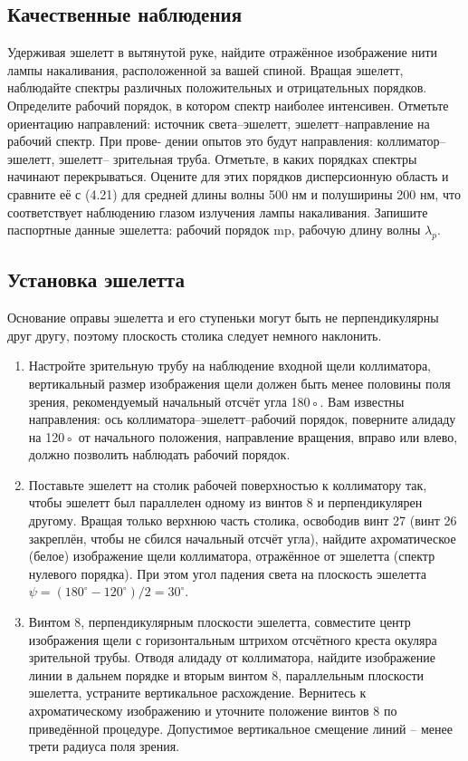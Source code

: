 \documentclass[a4paper]{article}
\begin{document}
\subsection{Качественные наблюдения}
Удерживая эшелетт в вытянутой руке, найдите отражённое изображение
нити лампы накаливания, расположенной за вашей спиной.
Вращая эшелетт, наблюдайте спектры различных положительных и отрицательных
порядков. Определите рабочий порядок, в котором спектр
наиболее интенсивен. Отметьте ориентацию направлений: источник
света–эшелетт, эшелетт–направление на рабочий спектр. При прове-
дении опытов это будут направления: коллиматор–эшелетт, эшелетт–
зрительная труба.
Отметьте, в каких порядках спектры начинают перекрываться. Оцените
для этих порядков дисперсионную область и сравните её с (4.21)
для средней длины волны 500 нм и полуширины 200 нм, что соответствует
наблюдению глазом излучения лампы накаливания. Запишите
паспортные данные эшелетта: рабочий порядок mp, рабочую длину волны
$\lambda_p$.

\subsection{Установка эшелетта}
Основание оправы эшелетта и его ступеньки могут быть не перпендикулярны
друг другу, поэтому плоскость столика следует немного
наклонить.
\begin{enumerate}
  \item Настройте зрительную трубу на наблюдение входной щели коллиматора,
  вертикальный размер изображения щели должен быть менее половины
  поля зрения, рекомендуемый начальный отсчёт угла 180◦. Вам
  известны направления: ось коллиматора–эшелетт–рабочий порядок, поверните
  алидаду на 120◦ от начального положения, направление вращения,
  вправо или влево, должно позволить наблюдать рабочий порядок.
  \item Поставьте эшелетт на столик рабочей поверхностью к коллиматору так,
  чтобы эшелетт был параллелен одному из винтов 8 и перпендикулярен
  другому. Вращая только верхнюю часть столика, освободив винт 27
  (винт 26 закреплён, чтобы не сбился начальный отсчёт угла), найдите
  ахроматическое (белое) изображение щели коллиматора, отражённое
  от эшелетта (спектр нулевого порядка). При этом угол падения света
  на плоскость эшелетта $\psi = (180^{\circ} - 120^{\circ})/2 = 30^{\circ}$.
  \item Винтом 8, перпендикулярным плоскости эшелетта, совместите центр
  изображения щели с горизонтальным штрихом отсчётного креста окуляра
  зрительной трубы. Отводя алидаду от коллиматора, найдите изображение
  линии в дальнем порядке и вторым винтом 8, параллельным
  плоскости эшелетта, устраните вертикальное расхождение. Вернитесь
  к ахроматическому изображению и уточните положение винтов 8 по
  приведённой процедуре. Допустимое вертикальное смещение линий --
  менее трети радиуса поля зрения.
\end{enumerate}
\end{document}
